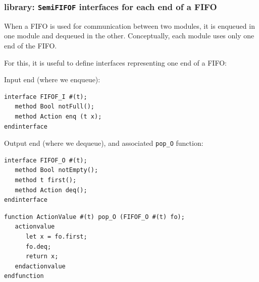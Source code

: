 \begin{frame}[fragile]
\frametitle{{\BSV} library: {\tt SemiFIFOF} interfaces for each end of a FIFO}

\footnotesize

When a FIFO is used for communication between two modules, it is
enqueued in one module and dequeued in the other.  Conceptually, each
module uses only one end of the FIFO.

\vspace{1ex}

For this, it is useful to define interfaces representing one end of a FIFO:

\vspace{1ex}

Input end (where we enqueue):
\begin{Verbatim}[frame=single]
interface FIFOF_I #(t);
   method Bool notFull();
   method Action enq (t x);
endinterface
\end{Verbatim}

\vspace{1ex}

Output end (where we dequeue), and associated \verb|pop_O| function:

\begin{minipage}[t]{0.3\textwidth}
\begin{Verbatim}[frame=single]
interface FIFOF_O #(t);
   method Bool notEmpty();
   method t first();
   method Action deq();
endinterface
\end{Verbatim}
\end{minipage}
\hm
\begin{minipage}[t]{0.6\textwidth}
\begin{Verbatim}[frame=single]
function ActionValue #(t) pop_O (FIFOF_O #(t) fo);
   actionvalue
      let x = fo.first;
      fo.deq;
      return x;
   endactionvalue
endfunction
\end{Verbatim}
\end{minipage}

\end{frame}


